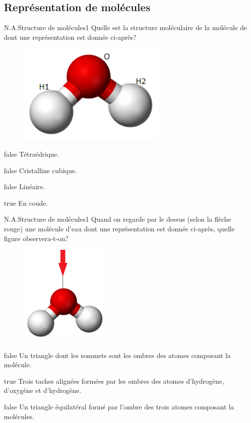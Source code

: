 \documentclass[11pt]{article}
\begin{document}
    \subsection{Représentation de molécules}
		\begin{question}{N.A.}{Structure de molécules}{1}{}
			Quelle est la structure moléculaire de la molécule de  dont une représentation est donnée ci-après?
			\begin{figure}
				\centering
				\includegraphics[height = 5cm]{Antoine/Figures_Antoine/240px-Water-3D-balls.png}
			\end{figure}
		\end{question}
		\begin{reponses}
			\item[false] Tétraédrique.
			\item[false] Cristalline cubique.
			\item[false] Linéaire.
			\item[true] En coude.
		\end{reponses}
		
		\begin{question}{N.A.}{Structure de molécules}{1}{}
			Quand on regarde par le dessus (selon la flèche rouge) une molécule d'eau  dont une représentation est donnée ci-après, quelle figure observera-t-on?
			\begin{figure}
				\centering
				\includegraphics[height = 5cm]{Antoine/Figures_Antoine/240px-Water-3D-balls3.png}
			\end{figure}
		\end{question}
		\begin{reponses}
			\item[false] Un triangle dont les sommets sont les ombres des atomes composant la molécule.
			\item[true] Trois taches alignées formées par les ombres des atomes d'hydrogène, d'oxygène et d'hydrogène.
			\item[false] Un triangle équilatéral formé par l'ombre des trois atomes composant la molécules.
		\end{reponses}
		
\end{document}

